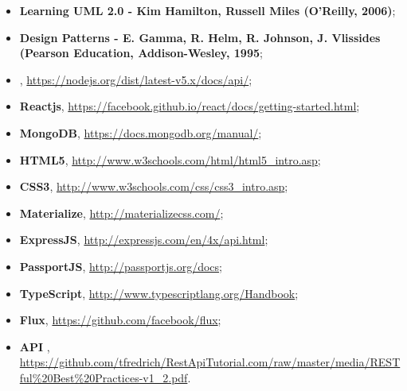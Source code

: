 \begin{itemize}
\item \textbf{Learning UML 2.0 - Kim Hamilton, Russell Miles (O’Reilly, 2006)};
\item \textbf{Design Patterns - E. Gamma, R. Helm, R. Johnson, J. Vlissides (Pearson Education, Addison-Wesley, 1995};
\item \textbf{}, \url{https://nodejs.org/dist/latest-v5.x/docs/api/};
\item \textbf{Reactjs}, \url{https://facebook.github.io/react/docs/getting-started.html};
\item \textbf{MongoDB}, \url{https://docs.mongodb.org/manual/};
\item \textbf{HTML5}, \url{http://www.w3schools.com/html/html5\_intro.asp};
\item \textbf{CSS3}, \url{http://www.w3schools.com/css/css3\_intro.asp};
\item \textbf{Materialize}, \url{http://materializecss.com/};
\item \textbf{ExpressJS}, \url{http://expressjs.com/en/4x/api.html};
\item \textbf{PassportJS}, \url{http://passportjs.org/docs};
\item \textbf{TypeScript}, \url{http://www.typescriptlang.org/Handbook};
\item \textbf{Flux}, \url{https://github.com/facebook/flux};
\item \textbf{API }, \url{https://github.com/tfredrich/RestApiTutorial.com/raw/master/media/RESTful\%20Best\%20Practices-v1\_2.pdf}.
\end{itemize}

